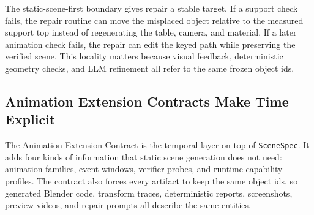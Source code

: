 \documentclass{article}
\newcommand{\code}[1]{\texttt{#1}}
\begin{document}
The static-scene-first boundary gives repair a stable target. If a support check fails, the repair routine can move the misplaced object relative to the measured support top instead of regenerating the table, camera, and material. If a later animation check fails, the repair can edit the keyed path while preserving the verified scene. This locality matters because visual feedback, deterministic geometry checks, and LLM refinement all refer to the same frozen object ids.

\subsection{Animation Extension Contracts Make Time Explicit}

The Animation Extension Contract is the temporal layer on top of \code{SceneSpec}. It adds four kinds of information that static scene generation does not need: animation families, event windows, verifier probes, and runtime capability profiles. The contract also forces every artifact to keep the same object ids, so generated Blender code, transform traces, deterministic reports, screenshots, preview videos, and repair prompts all describe the same entities.
\end{document}
